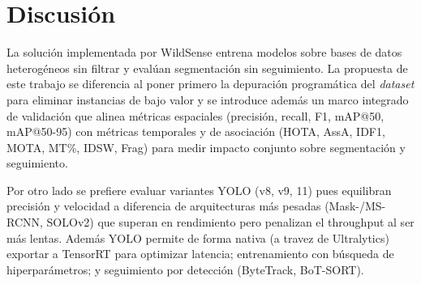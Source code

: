 \section{Discusión}
La solución implementada por WildSense entrena modelos sobre bases de datos heterogéneos sin filtrar y evalúan segmentación sin seguimiento. La propuesta de este trabajo se diferencia al poner primero la depuración programática del \textit{dataset} para eliminar instancias de bajo valor y se introduce además un marco integrado de validación que alinea métricas espaciales (precisión, recall, F1, mAP@50, mAP@50-95) con métricas temporales y de asociación (HOTA, AssA, IDF1, MOTA, MT\%, IDSW, Frag) para medir impacto conjunto sobre segmentación y seguimiento.

Por otro lado se prefiere evaluar variantes YOLO (v8, v9, 11) pues equilibran precisión y velocidad a diferencia de arquitecturas más pesadas (Mask-/MS-RCNN, SOLOv2) que superan en rendimiento pero penalizan el throughput al ser más lentas. Además YOLO permite de forma nativa (a travez de Ultralytics) exportar a TensorRT para optimizar latencia; entrenamiento con búsqueda de hiperparámetros; y seguimiento por detección (ByteTrack, BoT-SORT).
